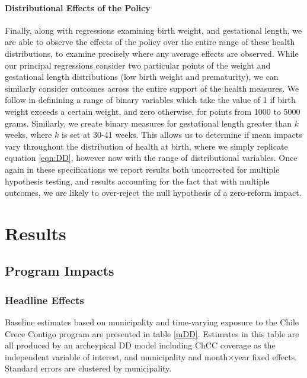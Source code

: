 \documentclass[12pt]{article}
\begin{document}
\begin{spacing}{1.4}
\paragraph{Distributional Effects of the Policy}
Finally, along with regressions examining birth weight, and
gestational length, we are able to observe the effects of the
policy over the entire range of these health distributions, to
examine precisely where any average effects are observed.  While
our principal regressions consider two particular points of the
weight and gestational length distributions (low birth weight and
prematurity), we can similarly consider outcomes across the entire
support of the health measures. We follow \citet{RossinSlater2013}
in definining a range of binary variables which take the value of
1 if birth weight exceeds a certain weight, and zero otherwise,
for points from 1000 to 5000 grams.  Similarly, we create binary
measures for gestational length greater than $k$ weeks, where
$k$ is set at 30-41 weeks.  This allows us to determine if mean
impacts vary throughout the distribution of health at birth,
where we simply replicate equation \ref{eqn:DD}, however now with
the range of distributional variables.  Once again in these
specifications we report results both uncorrected for multiple
hypothesis testing, and results accounting for the fact that with
multiple outcomes, we are likely to over-reject the null hypothesis
of a zero-reform impact.

\section{Results}
\subsection{Program Impacts}
\subsubsection{Headline Effects}
\label{scn:headline}
Baseline estimates based on municipality and time-varying exposure
to the Chile Crece Contigo program are presented in table \ref{mDD}.
Estimates in this table are all produced by an archeypical DD model
including ChCC coverage as the independent variable of interest, and
municipality and month$\times$year fixed effects.  Standard errors
are clustered by municipality.


\end{spacing}
\end{document}
